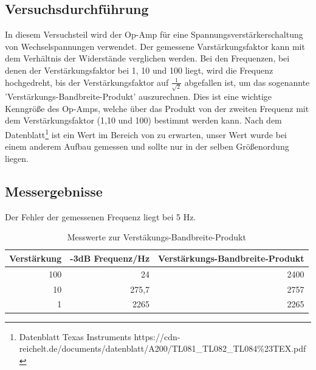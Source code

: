 \documentclass[12pt,a4paper]{article}
\begin{document}
\subsection{Versuchsdurchführung}
In diesem Versuchsteil wird der Op-Amp für eine Spannungsverstärkerschaltung von Wechselspannungen verwendet. Der gemessene Varstärkungsfaktor kann mit dem Verhältnis der Widerstände verglichen werden. Bei den Frequenzen, bei denen der Verstärkungsfaktor bei 1, 10 und 100 liegt, wird die Frequenz hochgedreht, bis der Verstärkungsfaktor auf $\frac{1}{\sqrt{2}}$ abgefallen ist, um das sogenannte 'Verstärkungs-Bandbreite-Produkt' auszurechnen. Dies ist eine wichtige Kenngröße des Op-Amps, welche über das Produkt von der zweiten Frequenz mit dem Verstärkungsfaktor (1,10 und 100) bestimmt werden kann. Nach dem Datenblatt\footnote{ Datenblatt Texas Instruments https://cdn-reichelt.de/documents/datenblatt/A200/TL081\_TL082\_TL084\%23TEX.pdf  } ist ein Wert im Bereich von  zu erwarten, unser Wert wurde bei einem anderem Aufbau gemessen und sollte nur in der selben Größenordung liegen.
\subsection{Messergebnisse}

Der Fehler der gemessenen Frequenz liegt bei 5 Hz.

\begin{table}[H]
\caption{Messwerte zur Verstäkungs-Bandbreite-Produkt}
\begin{center}
\begin{tabular}{|r|r|r|}
\hline
\multicolumn{1}{|l|}{Verstärkung} & \multicolumn{1}{l|}{-3dB Frequenz/Hz} & \multicolumn{1}{l|}{Verstärkungs-Bandbreite-Produkt} \\ \hline
100 & 24 & 2400 \\ \hline
10 & 275,7 & 2757 \\ \hline
1 & 2265 & 2265 \\ \hline
\end{tabular}
\end{center}
\label{tab:2_3}
\end{table}
\end{document}
